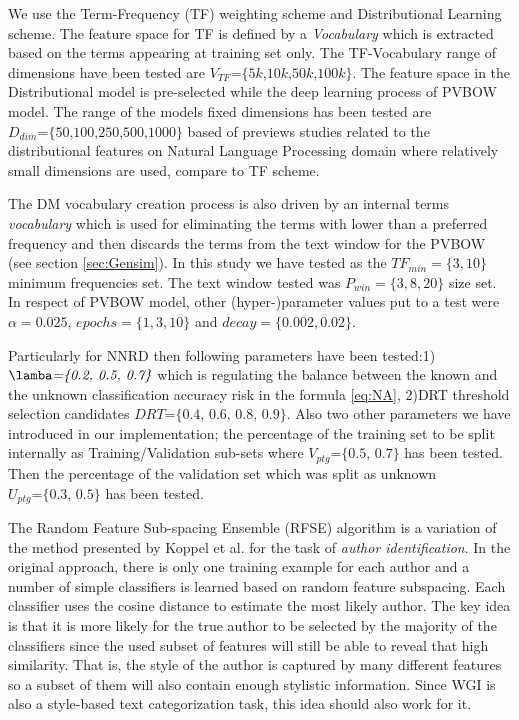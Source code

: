 We use the Term-Frequency (TF) weighting scheme and Distributional Learning scheme. The feature space for TF is defined by a \textit{Vocabulary} which is extracted based on the terms appearing at training set only. The TF-Vocabulary range of dimensions have been tested are $V_{TF}\textit{=\{5k,10k,50k,100k\}}$. The feature space in the Distributional model is pre-selected while the deep learning process of PVBOW model. The range of the models fixed dimensions has been tested are $D_{dim}\textit{=\{50,100,250,500,1000\}}$ based of previews studies related to the distributional features on Natural Language Processing domain where relatively small dimensions are used, compare to TF scheme.

The DM vocabulary creation process is also driven by an internal terms \textit{vocabulary} which is used for eliminating the terms with lower than a preferred frequency and then discards the terms from the text window for the PVBOW (see section \ref{sec:Gensim}). In this study we have tested as the $TF_{min}=\{3,10\}$ minimum frequencies set. The text window tested was $P_{win}=\{3,8,20\}$ size set. In respect of PVBOW model, other (hyper-)parameter values put to a test were $\alpha=0.025$, $epochs=\{1, 3, 10\}$ and $decay=\{0.002, 0.02\}$.

Particularly for NNRD then following parameters have been tested:1) $\lamba\textit{=\{0.2, 0.5, 0.7\}}$ which is regulating the balance between the known and the unknown classification accuracy risk in the formula \ref{eq:NA}, 2)DRT threshold selection candidates $DRT\textit{=\{0.4, 0.6, 0.8, 0.9\}}$. Also two other parameters we have introduced in our implementation; the percentage of the training set to be split internally as Training/Validation sub-sets where $V_{ptg}\textit{=\{0.5, 0.7\}}$ has been tested. Then the percentage of the validation set which was split as unknown $U_{ptg}\textit{=\{0.3, 0.5\}}$ has been tested.

The Random Feature Sub-spacing Ensemble (RFSE) algorithm is a variation of the method presented by Koppel et al. \citep{koppel2011authorship} for the task of \textit{author identification}. In the original approach, there is only one training example for each author and a number of simple classifiers is learned based on random feature subspacing. Each classifier uses the cosine distance to estimate the most likely author. The key idea is that it is more likely for the true author to be selected by the majority of the classifiers since the used subset of features will still be able to reveal that high similarity.  That is, the style of the author is captured by many different features so a subset of them will also contain enough stylistic information. Since WGI is also a style-based text categorization task, this idea should also work for it.

